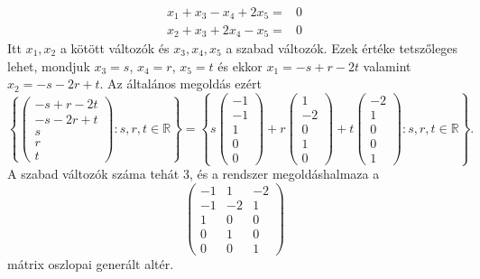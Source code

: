 \documentclass[9pt, a4paper, showtrims]{memoir}
\theoremstyle{plain}
\theoremstyle{remark}
\theoremstyle{definition}
\begin{document}
\begin{enumerate}
	      \[
		      \begin{array}{rl}
			      x_1+x_3-x_4+2x_5= & 0 \\
			      x_2+x_3+2x_4-x_5= & 0
		      \end{array}
	      \]
	      Itt $x_1,x_2$ a kötött változók és $x_3,x_4,x_5$ a szabad változók.
	      Ezek értéke tetszőleges lehet, mondjuk $x_3=s$, $x_4=r$, $x_5=t$ és ekkor
	      $x_1=-s+r-2t$ valamint $x_2=-s-2r+t$.
	      Az általános megoldás ezért
	      \[
		      \left\{
		      \begin{pmatrix}
			      -s+r-2t \\
			      -s-2r+t \\
			      s       \\
			      r       \\
			      t
		      \end{pmatrix}
		      :s,r,t\in\mathbb{R}
		      \right\}
		      =
		      \left\{ s
		      \begin{pmatrix}
			      -1 \\-1\\1\\0\\0
		      \end{pmatrix}
		      +
		      r
		      \begin{pmatrix}
			      1 \\-2\\0\\1\\0
		      \end{pmatrix}
		      +
		      t
		      \begin{pmatrix}
			      -2 \\1\\0\\0\\1
		      \end{pmatrix}
		      :s,r,t\in\mathbb{R}
		      \right\}.
	      \]
	      A szabad változók száma tehát $3$,
	      és a rendszer megoldáshalmaza a
	      \[
		      \begin{pmatrix}
			      -1 & 1  & -2 \\
			      -1 & -2 & 1  \\
			      1  & 0  & 0  \\
			      0  & 1  & 0  \\
			      0  & 0  & 1
		      \end{pmatrix}
	      \]
	      mátrix oszlopai generált altér.
\end{enumerate}
\end{document}
